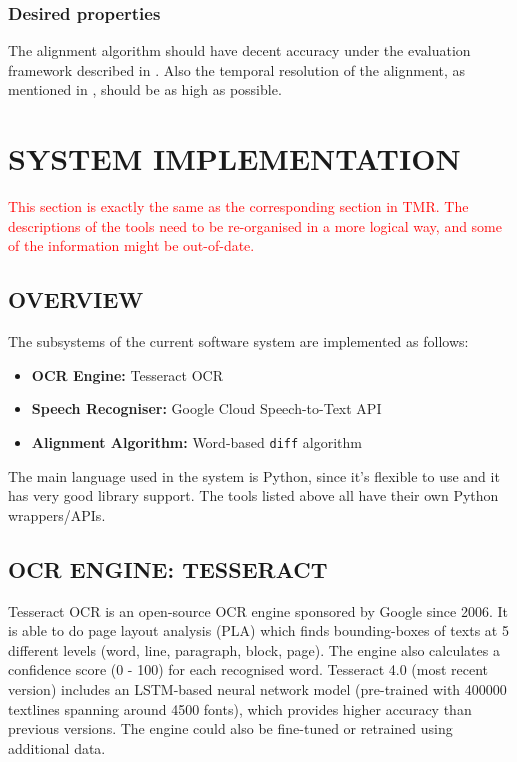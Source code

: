 \documentclass[12pt]{article}
\begin{document}
\subsubsection{Desired properties}

The alignment algorithm should have decent accuracy under the evaluation framework described in . Also the temporal resolution of the alignment, as mentioned in , should be as high as possible.


\section{SYSTEM IMPLEMENTATION}

\textcolor{red}{\Large This section is exactly the same as the corresponding section in TMR. The descriptions of the tools need to be re-organised in a more logical way, and some of the information might be out-of-date.}

\subsection{OVERVIEW}

The subsystems of the current software system are implemented as follows:
\begin{itemize}
    \setlength{\itemsep}{0.05em}
    \item \textbf{OCR Engine:} Tesseract OCR \cite{tesseract}
    \item \textbf{Speech Recogniser:} Google Cloud Speech-to-Text API \cite{googlecloud}
    \item \textbf{Alignment Algorithm:} Word-based \texttt{diff} algorithm
\end{itemize}
The main language used in the system is Python, since it's flexible to use and it has very good library support. The tools listed above all have their own Python wrappers/APIs.

\subsection{OCR ENGINE: TESSERACT}

Tesseract OCR is an open-source OCR engine sponsored by Google since 2006. It is able to do page layout analysis (PLA) which finds bounding-boxes of texts at 5 different levels (word, line, paragraph, block, page). The engine also calculates a confidence score (0 - 100) for each recognised word. Tesseract 4.0 (most recent version) includes an LSTM-based neural network model (pre-trained with 400000 textlines spanning around 4500 fonts), which provides higher accuracy than previous versions. The engine could also be fine-tuned or retrained using additional data.
\end{document}
